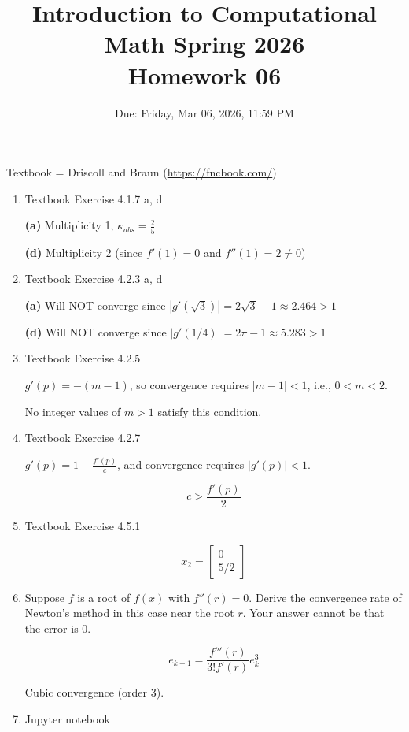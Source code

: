 \documentclass[reqno, answers]{exam}
\title{Introduction to Computational Math Spring 2026 \\ Homework 06}
\date{Due: Friday, Mar 06, 2026, 11:59 PM}
\author{}
\begin{document}
\maketitle
\thispagestyle{empty}

Textbook = Driscoll and Braun (\url{https://fncbook.com/})

\begin{enumerate}

\item Textbook Exercise 4.1.7 a, d
\begin{solution}
\textbf{(a)} Multiplicity 1, $\kappa_{abs} = \frac{2}{5}$

\textbf{(d)} Multiplicity 2 (since $f'(1) = 0$ and $f''(1) = 2 \neq 0$)
\end{solution}

\item Textbook Exercise 4.2.3 a, d
\begin{solution}
\textbf{(a)} Will NOT converge since $|g'(\sqrt{3})| = 2\sqrt{3} - 1 \approx 2.464 > 1$

\textbf{(d)} Will NOT converge since $|g'(1/4)| = 2\pi - 1 \approx 5.283 > 1$
\end{solution}

\item Textbook Exercise 4.2.5
\begin{solution}
$g'(p) = -(m-1)$, so convergence requires $|m-1| < 1$, i.e., $0 < m < 2$.

No integer values of $m > 1$ satisfy this condition.
\end{solution}

\item Textbook Exercise 4.2.7
\begin{solution}
$g'(p) = 1 - \frac{f'(p)}{c}$, and convergence requires $|g'(p)| < 1$.

$$c > \frac{f'(p)}{2}$$
\end{solution}

\item Textbook Exercise 4.5.1
\begin{solution}
$$x_2 = \begin{bmatrix} 0 \\ 5/2 \end{bmatrix}$$
\end{solution}

\item Suppose $f$ is a root of $f(x)$ with $f''(r) = 0$. Derive the convergence rate of Newton's method in this case near the root $r$. Your answer cannot be that the error is 0.

\begin{solution}
$$e_{k+1} = \frac{f'''(r)}{3!f'(r)} e_k^3$$

Cubic convergence (order 3).
\end{solution}

\item Jupyter notebook

\end{enumerate}
\end{document}
